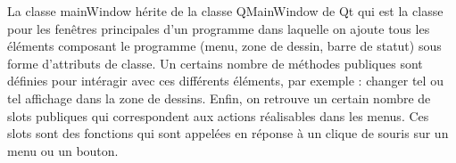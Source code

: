 La classe mainWindow h\'erite de la classe QMainWindow de Qt qui est la classe pour les fen\^etres principales d'un programme dans laquelle on ajoute tous les \'el\'ements composant le programme (menu, zone de dessin, barre de statut) sous forme d'attributs de classe.
Un certains nombre de m\'ethodes publiques sont d\'efinies pour int\'eragir avec ces diff\'erents \'el\'ements, par exemple : changer tel ou tel affichage dans la zone de dessins.
Enfin, on retrouve un certain nombre de slots publiques qui correspondent aux actions r\'ealisables dans les menus. Ces slots sont des fonctions qui sont appel\'ees en r\'eponse \`a un clique de souris sur un menu ou un bouton.